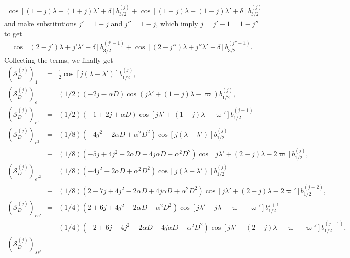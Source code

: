 \documentclass [12pt, a4paper] {article}
\begin{document}
\begin {eqnarray}
    \cos[(1-j)\lambda + (1+j)\lambda' + \delta]
    b_{3/2}^{(j)}
    +
    \cos[(1+j)\lambda + (1-j)\lambda' + \delta]
    b_{3/2}^{(j)}
\end {eqnarray}
and make substitutions $j'=1+j$ and $j''=1-j$, which imply 
$j= j' - 1 = 1 - j''$ to get
\begin {eqnarray}
    \cos[(2 - j')\lambda + j'\lambda' + \delta]
    b_{3/2}^{(j' - 1)}
    +
    \cos[(2 - j'')\lambda + j''\lambda' + \delta]
    b_{3/2}^{(j'' - 1)}.
\end {eqnarray}
Collecting the terms, we finally get 
\begin {eqnarray}
    \left(\mathcal{S}_D^{(j)}\right)_1 &=& \frac{1}{2}\cos[j(\lambda - \lambda')]
    b_{1/2}^{(j)}, 
    \\
    \left(\mathcal{S}_D^{(j)}\right)_e 
    &=& 
    (1/2)\left(-2j-\alpha D\right)
    \cos(j\lambda' + (1-j)\lambda - \varpi)
    b_{1/2}^{(j)},
    \\
    \left(\mathcal{S}_D^{(j)}\right)_{e'} &=& 
    (1/2)
    \left(
        -1 + 2j + \alpha D
    \right)
    \cos[j\lambda' + (1 - j)\lambda - \varpi']
    b_{1/2}^{(j - 1)}
    \\
    \left(\mathcal{S}_D^{(j)}\right)_{e^2} 
    &=& 
    (1/8)\left(-4j^2 + 2\alpha D + \alpha^2D^2\right)\cos[j(\lambda - \lambda')]
    b_{1/2}^{(j)}
    \\\nonumber
    &+& 
    (1/8)\left(-5j + 4j^2 - 2\alpha D + 4j\alpha D + \alpha^2D^2\right)
    \cos[j\lambda' + (2 - j)\lambda - 2\varpi]
    b_{1/2}^{(j)},
    \\
    \left(\mathcal{S}_D^{(j)}\right)_{e'^2} &=& 
    (1/8)
    \left(
        -4j^2 + 2\alpha D + \alpha^2D^2
    \right)
    \cos[j(\lambda - \lambda')]
    b_{1/2}^{(j)}
    \\\nonumber
    &+&
    (1/8)
    \left(
        2 - 7j + 4j^2 - 2\alpha D + 4j\alpha D + \alpha^2 D^2
    \right)
    \cos[j\lambda' + (2 - j)\lambda - 2\varpi']
    b_{1/2}^{(j-2)},
    \\
    \left(\mathcal{S}_D^{(j)}\right)_{ee'} 
    &=& 
    (1/4)
    \left(
        2 + 6j + 4j^2 - 2\alpha D - \alpha^2D^2
    \right)
    \cos[j\lambda' - j\lambda - \varpi + \varpi']b_{1/2}^{j + 1}
    \\\nonumber
    &+&
    (1/4)
    \left(
        -2 + 6j - 4j^2 + 2\alpha D - 4j\alpha D - \alpha^2D^2
    \right)
    \cos[j\lambda' + (2-j) \lambda - \varpi - \varpi']b_{1/2}^{(j - 1)},
    \\
    \left(\mathcal{S}_D^{(j)}\right)_{ss'} &=& 

\end{eqnarray}
\end{document}
